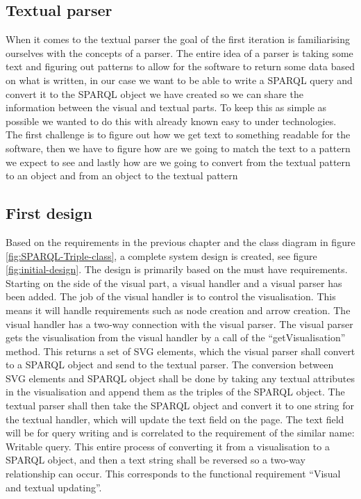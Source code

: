 \subsection{Textual parser}
 When it comes to the textual parser the goal of the first iteration is familiarising ourselves with the concepts of a parser. The entire idea of a parser is taking some text and figuring out patterns to allow for the software to return some data based on what is written, in our case we want to be able to write a SPARQL query and convert it to the SPARQL object we have created so we can share the information between the visual and textual parts. To keep this as simple as possible we wanted to do this with already known easy to under technologies. The first challenge is to figure out how we get text to something readable for the software, then we have to figure how are we going to match the text to a pattern we expect to see and lastly how are we going to convert from the textual pattern to an object and from an object to the textual pattern
 
\subsection{First design}
Based on the requirements in the previous chapter and the class diagram in figure \ref{fig:SPARQL-Triple-class}, a complete system design is created, see figure \ref{fig:initial-design}. The design is primarily based on the must have requirements. Starting on the side of the visual part, a visual handler and a visual parser has been added. The job of the visual handler is to control the visualisation. This means it will handle requirements such as node creation and arrow creation. The visual handler has a two-way connection with the visual parser. The visual parser gets the visualisation from the visual handler by a call of the “getVisualisation” method. This returns a set of SVG elements, which the visual parser shall convert to a SPARQL object and send to the textual parser. The conversion between SVG elements and SPARQL object shall be done by taking any textual attributes in the visualisation and append them as the triples of the SPARQL object. The textual parser shall then take the SPARQL object and convert it to one string for the textual handler, which will update the text field on the page. The text field will be for query writing and is correlated to the requirement of the similar name: Writable query. This entire process of converting it from a visualisation to a SPARQL object, and then a text string shall be reversed so a two-way relationship can occur. This corresponds to the functional requirement “Visual and textual updating”.

